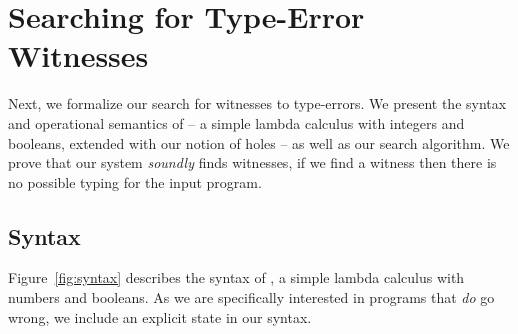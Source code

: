 \section{Searching for Type-Error Witnesses}
\label{sec:searching-witness}
%
%
%
%
Next, we formalize our search for witnesses to type-errors.
%
We present the syntax and operational semantics of \lang -- a simple
lambda calculus with integers and booleans, extended with our notion of
holes -- as well as our search algorithm.
%
We prove that our system \emph{soundly} finds witnesses, \ie if we find
a witness then there is no possible typing for the input program.
%
\subsection{Syntax}
\label{sec:syntax}

%
Figure~\ref{fig:syntax} describes the syntax of \lang, a simple lambda
calculus with numbers and booleans.
%
As we are specifically interested in
programs that \emph{do} go wrong, we include an explicit \stuck state in
our syntax.
%
